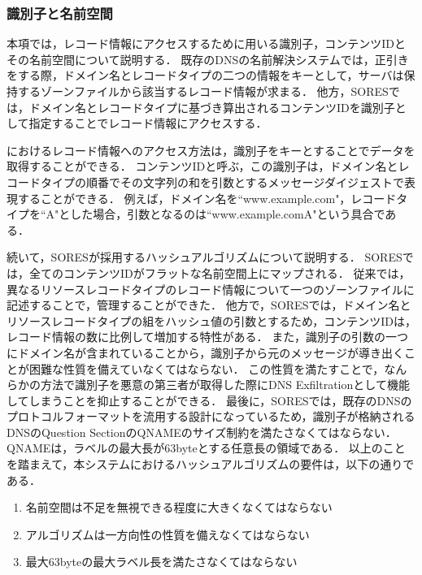 \subsubsection{識別子と名前空間}
本項では，レコード情報にアクセスするために用いる識別子，コンテンツIDとその名前空間について説明する．
既存のDNSの名前解決システムでは，正引きをする際，ドメイン名とレコードタイプの二つの情報をキーとして，サーバは保持するゾーンファイルから該当するレコード情報が求まる．
他方，SORESでは，ドメイン名とレコードタイプに基づき算出されるコンテンツIDを識別子として指定することでレコード情報にアクセスする．

におけるレコード情報へのアクセス方法は，識別子をキーとすることでデータを取得することができる．
コンテンツIDと呼ぶ，この識別子は，ドメイン名とレコードタイプの順番でその文字列の和を引数とするメッセージダイジェストで表現することができる．
例えば，ドメイン名を``www.example.com"，レコードタイプを``A"とした場合，引数となるのは``www.example.comA"という具合である．

続いて，SORESが採用するハッシュアルゴリズムについて説明する．
SORESでは，全てのコンテンツIDがフラットな名前空間上にマップされる．
従来では，異なるリソースレコードタイプのレコード情報について一つのゾーンファイルに記述することで，管理することができた．
他方で，SORESでは，ドメイン名とリソースレコードタイプの組をハッシュ値の引数とするため，コンテンツIDは，レコード情報の数に比例して増加する特性がある．
また，識別子の引数の一つにドメイン名が含まれていることから，識別子から元のメッセージが導き出くことが困難な性質を備えていなくてはならない．
この性質を満たすことで，なんらかの方法で識別子を悪意の第三者が取得した際にDNS Exfiltrationとして機能してしまうことを抑止することができる．
最後に，SORESでは，既存のDNSのプロトコルフォーマットを流用する設計になっているため，識別子が格納されるDNSのQuestion SectionのQNAMEのサイズ制約を満たさなくてはならない．
QNAMEは，ラベルの最大長が63byteとする任意長の領域である．
以上のことを踏まえて，本システムにおけるハッシュアルゴリズムの要件は，以下の通りである．

\begin{enumerate}
 \item 名前空間は不足を無視できる程度に大きくなくてはならない
 \vspace{-3mm}
 \item アルゴリズムは一方向性の性質を備えなくてはならない
 \vspace{-3mm}
 \item 最大63byteの最大ラベル長を満たさなくてはならない
 \vspace{-3mm}
\end{enumerate}


